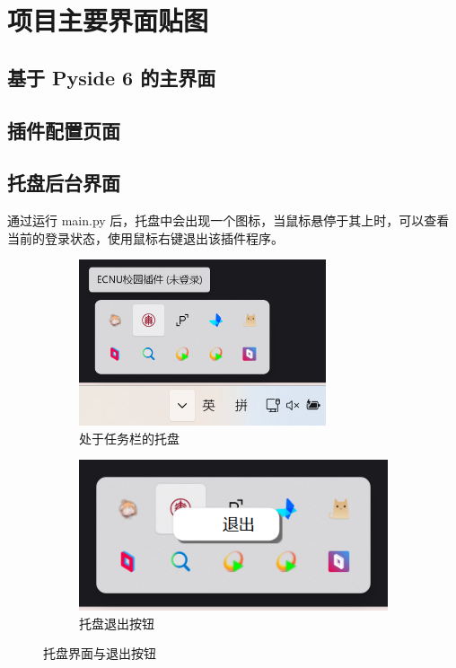 \documentclass[14pt,a4paper,UTF8,twoside]{article}
\begin{document}
    \section{项目主要界面贴图}

    \subsection{基于 Pyside 6 的主界面}

    \subsection{插件配置页面}

    \subsection{托盘后台界面}

    通过运行 main.py 后，托盘中会出现一个图标，当鼠标悬停于其上时，可以查看当前的登录状态，使用鼠标右键退出该插件程序。

    \begin{figure}[H]
        \centering
        \begin{subfigure}[b]{0.35\textwidth}
            \centering
            \includegraphics[width=0.8\textwidth]{img/tray_interface.png}
            \caption{处于任务栏的托盘}
            \label{fig:tray_interface}
        \end{subfigure}
        \hspace{0.06\textwidth}
        \begin{subfigure}[b]{0.3\textwidth}
            \centering
            \includegraphics[width=\textwidth]{img/tray_exit.png}
            \caption{托盘退出按钮}
            \label{fig:tray_exit}
        \end{subfigure}
        \caption{托盘界面与退出按钮}
        \label{fig:tray_combined}
    \end{figure}
\end{document}
